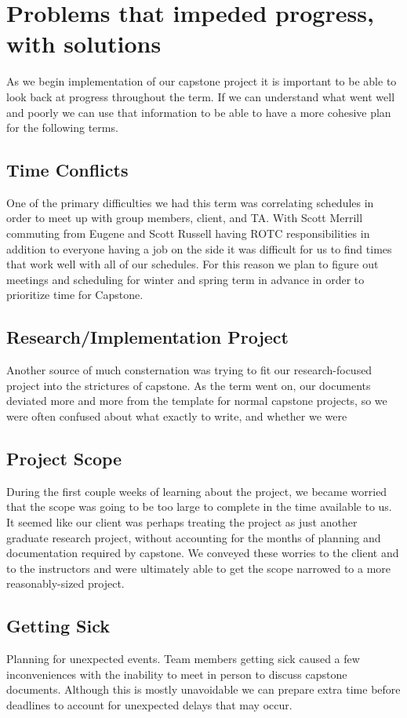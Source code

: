 \documentclass[onecolumn, draftclsnofoot,10pt, compsoc]{IEEEtran}
\begin{document}
\section{Problems that impeded progress, with solutions}
As we begin implementation of our capstone project it is important to be able to look back at progress throughout the term. If we can understand what went well and poorly we can use that information to be able to have a more cohesive plan for the following terms.

\subsection {Time Conflicts}
One of the primary difficulties we had this term was correlating schedules in order to meet up with group members, client, and TA. With Scott Merrill commuting from Eugene and Scott Russell having ROTC responsibilities in addition to everyone having a job on the side it was difficult for us to find times that work well with all of our schedules. For this reason we plan to figure out meetings and scheduling for winter and spring term in advance in order to prioritize time for Capstone.

\subsection {Research/Implementation Project}

Another source of much consternation was trying to fit our research-focused project into the strictures of capstone. 
As the term went on, our documents deviated more and more from the template for normal capstone projects, so we were often confused about what exactly to write, and whether we were 

\subsection {Project Scope}

During the first couple weeks of learning about the project, we became worried that the scope was going to be too large to complete in the time available to us. It seemed like our client was perhaps treating the project as just another graduate research project, without accounting for the months of planning and documentation required by capstone. We conveyed these worries to the client and to the instructors and were ultimately able to get the scope narrowed to a more reasonably-sized project.

\subsection {Getting Sick}
Planning for unexpected events. Team members getting sick caused a few inconveniences with the inability to meet in person to discuss capstone documents. Although this is mostly unavoidable we can prepare extra time before deadlines to account for unexpected delays that may occur.
\end{document}
